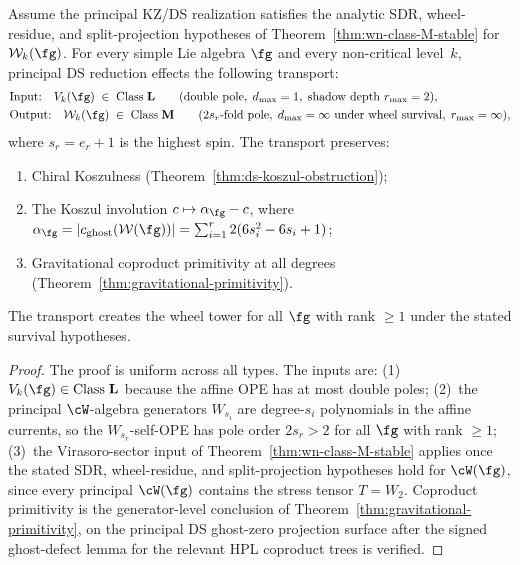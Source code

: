 \begin{proposition}
\label{prop:universal-ds-complexity}
%
Assume the principal KZ/DS realization satisfies the analytic SDR,
wheel-residue, and split-projection hypotheses of
Theorem~\textup{\ref{thm:wn-class-M-stable}} for
$\mathcal W_k(\fg)$. For every simple Lie algebra $\fg$ and every
non-critical level~$k$,
principal DS reduction effects the following transport:
\begin{align}
\label{eq:universal-transport}
&\text{Input:}\quad
V_k(\fg) \;\in\; \text{Class}\;\mathbf{L}
 \qquad(\text{double pole},\; d_{\max} = 1,\;
 \text{shadow depth } r_{\max} = 2), \\
&\text{Output:}\quad
\mathcal{W}_k(\fg) \;\in\; \text{Class}\;\mathbf{M}
 \qquad(\text{$2s_r$-fold pole},\;
 \text{$d_{\max} = \infty$ under wheel survival},\;
 r_{\max} = \infty), \notag
\end{align}
where $s_r = e_r + 1$ is the highest spin. The transport preserves:
\begin{enumerate}[label=\textup{(\alph*)}]
\item Chiral Koszulness
 \textup{(}Theorem~\textup{\ref{thm:ds-koszul-obstruction})};
\item The Koszul involution $c \mapsto \alpha_\fg - c$, where
 $\alpha_\fg = |c_{\mathrm{ghost}}(\mathcal{W}(\fg))| =
 \sum_{i=1}^r 2(6s_i^2 - 6s_i + 1)$;
\item Gravitational coproduct primitivity at all degrees
 \textup{(}Theorem~\textup{\ref{thm:gravitational-primitivity})}.
\end{enumerate}
The transport creates the wheel tower for all $\fg$ with rank $\ge 1$
under the stated survival hypotheses.
\end{proposition}

\begin{proof}
The proof is uniform across all types. The inputs are:
(1)~$V_k(\fg) \in \text{Class}\;\mathbf{L}$ because the affine
OPE has at most double poles;
(2)~the principal $\cW$-algebra generators $W_{s_i}$ are
degree-$s_i$ polynomials in the affine currents, so the
$W_{s_r}$-self-OPE has pole order $2s_r > 2$ for all $\fg$
with rank $\ge 1$;
(3)~the Virasoro-sector input of
Theorem~\ref{thm:wn-class-M-stable} applies once the stated SDR,
wheel-residue, and split-projection hypotheses hold for
$\cW(\fg)$, since every principal $\cW(\fg)$ contains the stress
tensor $T = W_2$.
Coproduct primitivity is the generator-level conclusion of
Theorem~\ref{thm:gravitational-primitivity}, on the principal DS
ghost-zero projection surface after the signed ghost-defect lemma for
the relevant HPL coproduct trees is verified.
\end{proof}

